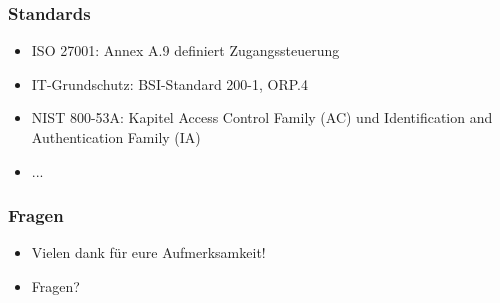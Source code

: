 \documentclass[11pt]{beamer}
\begin{document}
\begin{frame}
  \frametitle{Standards}
  \begin{itemize}
    \item ISO 27001: Annex A.9 definiert Zugangssteuerung
    \item IT-Grundschutz: BSI-Standard 200-1, ORP.4
    \item NIST 800-53A: Kapitel Access Control Family (AC) und Identification and Authentication Family (IA)
    \item ...
  \end{itemize}
\end{frame}

\begin{frame}
  \frametitle{Fragen}
  \begin{itemize}
    \item Vielen dank für eure Aufmerksamkeit!
    \item Fragen?
  \end{itemize}
\end{frame}
\end{document}
